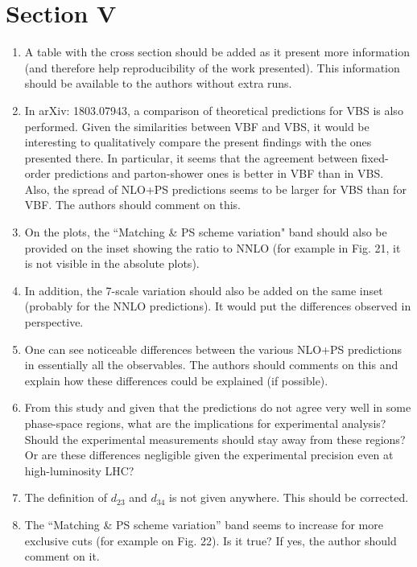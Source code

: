 \documentclass[12pt]{article}
\begin{document}
\section*{Section V}
\begin{enumerate}
\item A table with the cross section should be added as it present more information (and therefore help reproducibility of the work presented). This information should be available to the authors without extra runs.
\item In arXiv: 1803.07943, a comparison of theoretical predictions for VBS is also performed. Given the similarities between VBF and VBS, it would be interesting to qualitatively compare the present findings with the ones presented there. In particular, it seems that the agreement between fixed-order predictions and parton-shower ones is better in VBF than in VBS. Also, the spread of NLO+PS predictions seems to be larger for VBS than for VBF. The authors should comment on this.
\item On the plots, the ``Matching \& PS scheme variation" band should also be provided on the inset showing the ratio to NNLO (for example in Fig. 21, it is not visible in the absolute plots).
\item In addition, the 7-scale variation should also be added on the same inset (probably for the NNLO predictions). It would put the differences observed in perspective.
\item One can see noticeable differences between the various NLO+PS predictions in essentially all the observables. The authors should comments on this and explain how these differences could be explained (if possible).
\item From this study and given that the predictions do not agree very well in some phase-space regions, what are the implications for experimental analysis? Should the experimental measurements should stay away from these regions? Or are these differences negligible given the experimental precision even at high-luminosity LHC?
\item The definition of $d_{23}$ and $d_{34}$ is not given anywhere. This should be corrected.
\item The “Matching \& PS scheme variation” band seems to increase for more exclusive cuts (for example on Fig. 22). Is it true? If yes, the author should comment on it.
\end{enumerate}
\end{document}
